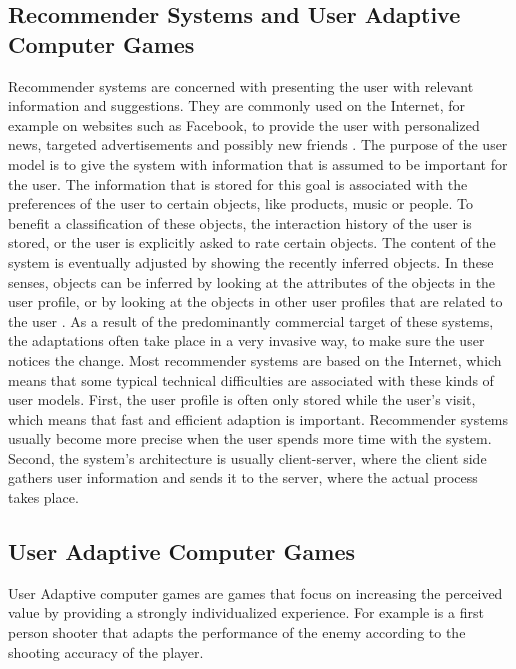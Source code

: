 \subsection{Recommender Systems and User Adaptive Computer Games}

Recommender systems are concerned with presenting the user with relevant
information and suggestions. They are commonly used on the Internet, for example
on websites such as Facebook, to provide the user with personalized news,
targeted advertisements and possibly new friends \cite{brun2010compass}. The
purpose of the user model is to give the system with information that is assumed
to be important for the user. The information that is stored for this goal is
associated with the preferences of the user to certain objects, like products,
music or people. To benefit a classification of these objects, the interaction
history of the user is stored, or the user is explicitly asked to rate certain
objects. The content of the system is eventually adjusted by showing the
recently inferred objects. In these senses, objects can be inferred by looking
at the attributes of the objects in the user profile, or by looking at the
objects in other user profiles that are related to the user \cite{kobsa2001generic}
\cite{kay2012coming}. As a result of the predominantly commercial target of these
systems, the adaptations often take place in a very invasive way, to make sure
the user notices the change. Most recommender systems are based on the Internet,
which means that some typical technical difficulties are associated with these
kinds of user models. First, the user profile is often only stored while the
user’s visit, which means that fast and efficient adaption is important.
Recommender systems usually become more precise when the user spends more time
with the system. Second, the system’s architecture is usually client-server,
where the client side gathers user information and sends it to the server, where
the actual process takes place.

\subsection{User Adaptive Computer Games}

User Adaptive computer games are games that focus on increasing the perceived
value by providing a strongly individualized experience. For
example is a first person shooter that adapts the performance of the enemy
according to the shooting accuracy of the player.


